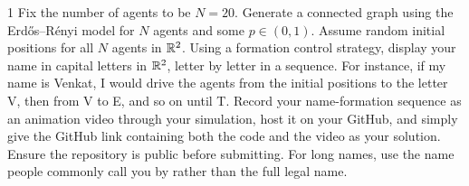 \documentclass[a4paper, 11pt]{article}
\begin{document}

\begin{problem}{1}
Fix the number of agents to be $N=20$. Generate a connected graph using the Erd\H{o}s--R\'enyi model for $N$ agents and some $p\in(0,1)$. Assume random initial positions for all $N$ agents in $\mathbb{R}^2$. Using a formation control strategy, display your name in capital letters in $\mathbb{R}^2$, letter by letter in a sequence. For instance, if my name is Venkat, I would drive the agents from the initial positions to the letter V, then from V to E, and so on until T. Record your name-formation sequence as an animation video through your simulation, host it on your GitHub, and simply give the GitHub link containing both the code and the video as your solution. Ensure the repository is public before submitting. For long names, use the name people commonly call you by rather than the full legal name.
\end{problem}
\end{document}

